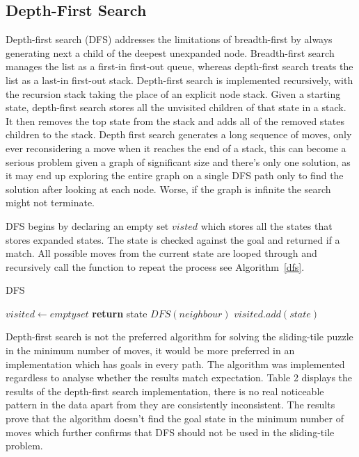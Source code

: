 \documentclass[final]{cmpreport}
\begin{document}
\subsection{Depth-First Search}
Depth-first search (DFS) addresses the limitations of breadth-first by always generating next a child of the deepest unexpanded node. Breadth-first search manages the list as a first-in first-out queue, whereas depth-first search treats the list as a last-in first-out stack. Depth-first search is implemented recursively, with the recursion stack taking the place of an explicit node stack. Given a starting state, depth-first search stores all the unvisited children of that state in a stack. It then removes the top state from the stack and adds all of the removed states children to the stack. Depth first search generates a long sequence of moves, only ever reconsidering a move when it reaches the end of a stack, this can become a serious problem given a graph of significant size and there's only one solution, as it may end up exploring the entire graph on a single DFS path only to find the solution after looking at each node. Worse, if the graph is infinite the search might not terminate.

DFS begins by declaring an empty set $visted$ which stores all the states that stores expanded states. The state is checked against the goal and returned if a match. All possible moves from the current state are looped through and recursively call the function to repeat the process see Algorithm~\ref{dfs}.
\begin{algorithm}
	\caption{DFS}\label{dfs}
	\begin{algorithmic}[1]
		\State $visited \gets empty set$
		\State \textbf{return} state
		\EndIf
		\State	$DFS(neighbour)$
		\EndIf
		\EndFor
		\State $visited.add(state)$
		\EndProcedure
	\end{algorithmic}
\end{algorithm}


Depth-first search is not the preferred algorithm for solving the sliding-tile puzzle in the minimum number of moves, it would be more preferred in an implementation which has goals in every path. The algorithm was implemented regardless to analyse whether the results match expectation. Table 2 displays the results of the depth-first search implementation, there is no real noticeable pattern in the data apart from they are consistently inconsistent. The results prove that the algorithm doesn't find the goal state in the minimum number of moves which further confirms that DFS should not be used in the sliding-tile problem. 
\end{document}
